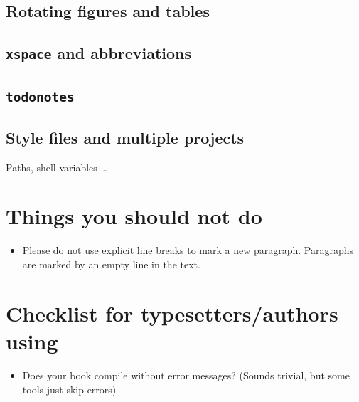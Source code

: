 \subsection{Rotating figures and tables}
 

\subsection{\texttt{xspace} and abbreviations}


\subsection{\texttt{todonotes}}





\subsection{Style files and multiple projects}

Paths, shell variables \ldots

\section{Things you should not do}

\begin{itemize}
\item Please do not use explicit line breaks to mark a new paragraph. Paragraphs are marked by an empty
line in the text.
\end{itemize}

\section{Checklist for typesetters/authors using \latex}
\label{sec-check-typesetters}

\begin{itemize}
\item Does your book compile without error messages? (Sounds trivial, but some tools just skip
  \latex errors)
\end{itemize}


